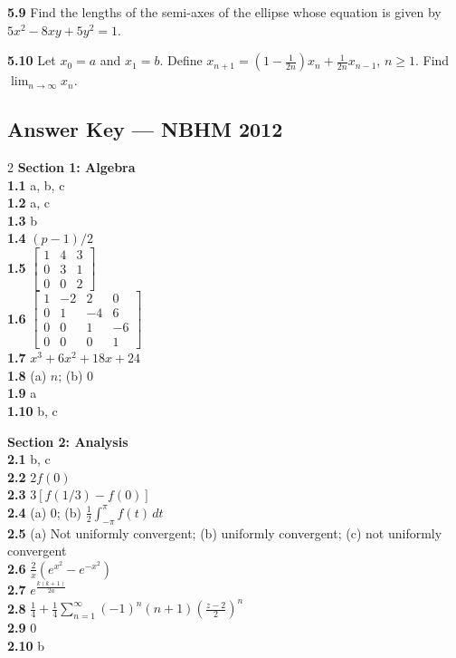 \documentclass[11pt,a4paper]{article}
\newcommand{\examsec}[1]{%
  \subsection*{#1}
  \vspace{-2pt}
}
\newcommand{\qitem}[1]{\par\medskip\noindent\textbf{#1}\hspace{0.5em}}
\begin{document}
\qitem{5.9} Find the lengths of the semi-axes of the ellipse whose equation is given by $5x^2 - 8xy + 5y^2 = 1$.

\qitem{5.10} Let $x_0 = a$ and $x_1 = b$. Define $x_{n+1} = \left(1 - \frac{1}{2n}\right)x_n + \frac{1}{2n}x_{n-1}$, $n \ge 1$. Find $\lim_{n \to \infty} x_n$.

\examsec{Answer Key --- NBHM 2012}
\begin{multicols}{2}
\textbf{Section 1: Algebra}\\
\textbf{1.1} a, b, c\\
\textbf{1.2} a, c\\
\textbf{1.3} b\\
\textbf{1.4} $(p - 1)/2$\\
\textbf{1.5} $\begin{bmatrix} 1 & 4 & 3 \\ 0 & 3 & 1 \\ 0 & 0 & 2 \end{bmatrix}$\\
\textbf{1.6} $\begin{bmatrix} 1 & -2 & 2 & 0 \\ 0 & 1 & -4 & 6 \\ 0 & 0 & 1 & -6 \\ 0 & 0 & 0 & 1 \end{bmatrix}$\\
\textbf{1.7} $x^3 + 6x^2 + 18x + 24$\\
\textbf{1.8} (a) $n$; (b) $0$\\
\textbf{1.9} a\\
\textbf{1.10} b, c

\medskip
\textbf{Section 2: Analysis}\\
\textbf{2.1} b, c\\
\textbf{2.2} $2f(0)$\\
\textbf{2.3} $3[f(1/3) - f(0)]$\\
\textbf{2.4} (a) $0$; (b) $\frac{1}{2}\int_{-\pi}^{\pi} f(t)\,dt$\\
\textbf{2.5} (a) Not uniformly convergent; (b) uniformly convergent; (c) not uniformly convergent\\
\textbf{2.6} $\frac{2}{x}\left(e^{x^2} - e^{-x^2}\right)$\\
\textbf{2.7} $e^{\frac{k(k+1)}{2a}}$\\
\textbf{2.8} $\frac{1}{4} + \frac{1}{4}\sum_{n=1}^{\infty} (-1)^n (n+1)\left(\frac{z-2}{2}\right)^n$\\
\textbf{2.9} $0$\\
\textbf{2.10} b


\end{multicols}
\end{document}
